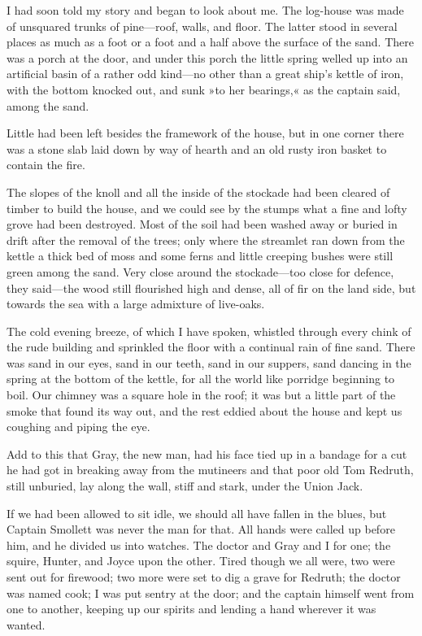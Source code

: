 I had soon told my story and began to look about me. The log-house was made of unsquared trunks of pine—roof, walls, and floor. The latter stood in several places as much as a foot or a foot and a half above the surface of the sand. There was a porch at the door, and under this porch the little spring welled up into an artificial basin of a rather odd kind—no other than a great ship's kettle of iron, with the bottom knocked out, and sunk »to her bearings,« as the captain said, among the sand.

Little had been left besides the framework of the house, but in one corner there was a stone slab laid down by way of hearth and an old rusty iron basket to contain the fire.

The slopes of the knoll and all the inside of the stockade had been cleared of timber to build the house, and we could see by the stumps what a fine and lofty grove had been destroyed. Most of the soil had been washed away or buried in drift after the removal of the trees; only where the streamlet ran down from the kettle a thick bed of moss and some ferns and little creeping bushes were still green among the sand. Very close around the stockade—too close for defence, they said—the wood still flourished high and dense, all of fir on the land side, but towards the sea with a large admixture of live-oaks.

The cold evening breeze, of which I have spoken, whistled through every chink of the rude building and sprinkled the floor with a continual rain of fine sand. There was sand in our eyes, sand in our teeth, sand in our suppers, sand dancing in the spring at the bottom of the kettle, for all the world like porridge beginning to boil. Our chimney was a square hole in the roof; it was but a little part of the smoke that found its way out, and the rest eddied about the house and kept us coughing and piping the eye.

Add to this that Gray, the new man, had his face tied up in a bandage for a cut he had got in breaking away from the mutineers and that poor old Tom Redruth, still unburied, lay along the wall, stiff and stark, under the Union Jack.

If we had been allowed to sit idle, we should all have fallen in the blues, but Captain Smollett was never the man for that. All hands were called up before him, and he divided us into watches. The doctor and Gray and I for one; the squire, Hunter, and Joyce upon the other. Tired though we all were, two were sent out for firewood; two more were set to dig a grave for Redruth; the doctor was named cook; I was put sentry at the door; and the captain himself went from one to another, keeping up our spirits and lending a hand wherever it was wanted.

